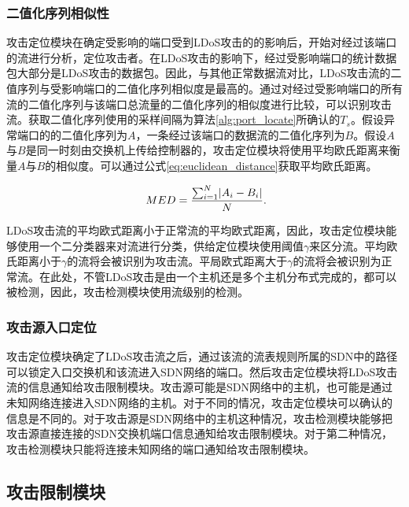 \subsubsection{二值化序列相似性}
\label{chap4:seq-similarity}

攻击定位模块在确定受影响的端口受到LDoS攻击的的影响后，开始对经过该端口的流进行分析，定位攻击者。在LDoS攻击的影响下，经过受影响端口的统计数据包大部分是LDoS攻击的数据包。因此，与其他正常数据流对比，LDoS攻击流的二值序列与受影响端口的二值化序列相似度是最高的。通过对经过受影响端口的所有流的二值化序列与该端口总流量的二值化序列的相似度进行比较，可以识别攻击流。获取二值化序列使用的采样间隔为算法\ref{alg:port_locate}所确认的$T_s$。假设异常端口的的二值化序列为$A$，一条经过该端口的数据流的二值化序列为$B$。假设$A$与$B$是同一时刻由交换机上传给控制器的，攻击定位模块将使用平均欧氏距离来衡量$A$与$B$的相似度。可以通过公式\ref{eq:euclidean_distance}获取平均欧氏距离。

\begin{equation}
	\vspace{-0.1in}
	\label{eq:euclidean_distance}
	\ MED=\frac{\sum_{i=1}^{N}\lvert A_{i} - B_{i}\rvert}{N}.
\end{equation}

LDoS攻击流的平均欧式距离小于正常流的平均欧式距离，因此，攻击定位模块能够使用一个二分类器来对流进行分类，供给定位模块使用阈值$\gamma$来区分流。平均欧氏距离小于$\gamma$的流将会被识别为攻击流。平局欧式距离大于$\gamma$的流将会被识别为正常流。在此处，不管LDoS攻击是由一个主机还是多个主机分布式完成的，都可以被检测，因此，攻击检测模块使用流级别的检测。


\subsubsection{攻击源入口定位}
\label{chap4:ingressportlocation}

攻击定位模块确定了LDoS攻击流之后，通过该流的流表规则所属的SDN中的路径可以锁定入口交换机和该流进入SDN网络的端口。然后攻击定位模块将LDoS攻击流的信息通知给攻击限制模块。攻击源可能是SDN网络中的主机，也可能是通过未知网络连接进入SDN网络的主机。对于不同的情况，攻击定位模块可以确认的信息是不同的。对于攻击源是SDN网络中的主机这种情况，攻击检测模块能够把攻击源直接连接的SDN交换机端口信息通知给攻击限制模块。对于第二种情况，攻击检测模块只能将连接未知网络的端口通知给攻击限制模块。

\subsection{攻击限制模块}
\label{chap4:Mitigator}

